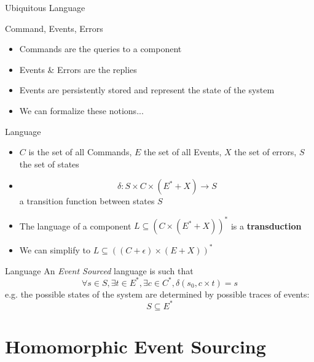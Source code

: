 \begin{frame}[fragile]{Ubiquitous Language}

\begin{center}
\end{center}
\end{frame}

\begin{frame}[fragile]{Command, Events, Errors}

  \begin{itemize}
  \item Commands are the queries to a component
  \item Events \& Errors are the replies
  \item Events are persistently stored and represent the state of the system
  \item We can formalize these notions...
  \end{itemize}
\end{frame}

\begin{frame}[fragile]{Language}
  \begin{itemize}
  \item $C$ is the set of all Commands, $E$ the set of all Events, $X$ the set of errors, $S$ the set of states
  \item $$\delta : S \times C \times (E^* + X) \rightarrow S$$ a transition function between states $S$
  \item The language of a component $L \subseteq (C \times (E^* + X))^*$ is a \textbf{transduction}
  \item We can simplify to $L \subseteq ((C + \epsilon) \times (E + X))^*$
  \end{itemize}
\end{frame}

\begin{frame}[fragile]{Language}
  An \emph{Event Sourced} language is such that
  $$\forall s \in S, \exists t \in E^*, \exists c \in C^*, \delta(s_0,c \times t) = s $$
  e.g. the possible states of the system are determined by possible traces of events:
  $$S \subseteq E^*$$
\end{frame}

\section{Homomorphic Event Sourcing}

